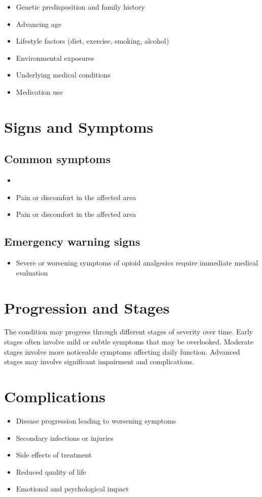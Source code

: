 \begin{itemize}[noitemsep]
  \item Genetic predisposition and family history
  \item Advancing age
  \item Lifestyle factors (diet, exercise, smoking, alcohol)
  \item Environmental exposures
  \item Underlying medical conditions
  \item Medication use
\end{itemize}
\section{Signs and Symptoms}

\subsection{Common symptoms}
\begin{itemize}[noitemsep]
  \item \item Pain or discomfort in the affected area    \item Pain or discomfort in the affected area
  \end{itemize}

\subsection{Emergency warning signs}
\begin{itemize}[noitemsep]
  \item Severe or worsening symptoms of opioid analgesics require immediate medical evaluation
\end{itemize}
\section{Progression and Stages}
The condition may progress through different stages of severity over time. Early stages often involve mild or subtle symptoms that may be overlooked. Moderate stages involve more noticeable symptoms affecting daily function. Advanced stages may involve significant impairment and complications.
\section{Complications}
\begin{itemize}[noitemsep]
  \item Disease progression leading to worsening symptoms
  \item Secondary infections or injuries
  \item Side effects of treatment
  \item Reduced quality of life
  \item Emotional and psychological impact
\end{itemize}

